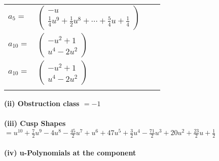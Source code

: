 \documentclass[1p]{elsarticle_modified}
\theoremstyle{definition}
\begin{document}
\begin{tabular}{m{7pt} m{180pt} m{7pt} m{180pt} }
\flushright $a_{5}=$&$\begin{pmatrix}- u\\\frac{1}{4} u^9+\frac{1}{2} u^8+\cdots+\frac{5}{4} u+\frac{1}{4}\end{pmatrix}$ \\
\flushright $a_{10}=$&$\begin{pmatrix}- u^2+1\\u^4-2 u^2\end{pmatrix}$\\ \flushright $a_{10}=$&$\begin{pmatrix}- u^2+1\\u^4-2 u^2\end{pmatrix}$\\&\end{tabular}
\flushleft \textbf{(ii) Obstruction class $= -1$}\\~\\
\flushleft \textbf{(iii) Cusp Shapes $= u^{10}+\frac{7}{2} u^9-4 u^8-\frac{45}{2} u^7+u^6+47 u^5+\frac{3}{2} u^4-\frac{71}{2} u^3+20 u^2+\frac{23}{2} u+\frac{1}{2}$}\\~\\
\newpage\renewcommand{\arraystretch}{1}
\flushleft \textbf{(iv) u-Polynomials at the component}\newline \\
\end{document}
